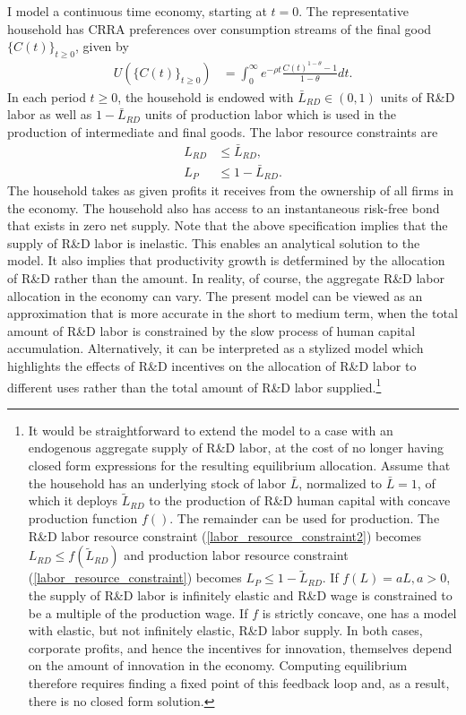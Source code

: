 \documentclass[ecta,nameyear,final]{econsocart}
\theoremstyle{plain}
\theoremstyle{remark}
\begin{document}
I model a continuous time economy, starting at $t = 0$. The representative household has CRRA preferences over consumption streams of the final good $\{C(t)\}_{t \ge 0}$, given by
\begin{align}
	U(\{C(t)\}_{t \ge 0}) &= \int_0^{\infty} e^{-\rho t} \frac{C(t)^{1-\theta} - 1}{1-\theta} dt. \label{preferences}
\end{align}
In each period $t \ge 0$, the household is endowed with $\bar{L}_{RD} \in (0,1)$ units of R\&D labor as well as $1 - \bar{L}_{RD}$ units of production labor which is used in the production of intermediate and final goods. The labor resource constraints are 
\begin{align}
	L_{RD} &\le \bar{L}_{RD}, \label{labor_resource_constraint2} \\
	L_{P} &\le 1 - \bar{L}_{RD}. \label{labor_resource_constraint} 
\end{align}
The household takes as given profits it receives from the ownership of all firms in the economy. The household also has access to an instantaneous risk-free bond that exists in zero net supply. Note that the above specification implies that the supply of R\&D labor is inelastic. This enables an analytical solution to the model. It also implies that productivity growth is detfermined by the allocation of R\&D rather than the amount. In reality, of course, the aggregate R\&D labor allocation in the economy can vary. The present model can be viewed as an approximation that is more accurate in the short to medium term, when the total amount of R\&D labor is constrained by the slow process of human capital accumulation. Alternatively, it can be interpreted as a stylized model which highlights the effects of R\&D incentives on the allocation of R\&D labor to different uses rather than the total amount of R\&D labor supplied.\footnote{It would be straightforward to extend the model to a case with an endogenous aggregate supply of R\&D labor, at the cost of no longer having closed form expressions for the resulting equilibrium allocation. Assume that the household has an underlying stock of labor $\bar{L}$, normalized to $\bar{L} = 1$, of which it deploys $\tilde{L}_{RD}$ to the production of R\&D human capital with concave production function $f()$. The remainder can be used for production. The R\&D labor resource constraint (\ref{labor_resource_constraint2}) becomes $L_{RD} \le f(\tilde{L}_{RD})$ and production labor resource constraint (\ref{labor_resource_constraint}) becomes $L_P \le 1 - \tilde{L}_{RD}$. If $f(L) = aL, a > 0$, the supply of R\&D labor is infinitely elastic and R\&D wage is constrained to be a multiple of the production wage. If $f$ is strictly concave, one has a model with elastic, but not infinitely elastic, R\&D labor supply. In both cases, corporate profits, and hence the incentives for innovation, themselves depend on the amount of innovation in the economy. Computing equilibrium therefore requires finding a fixed point of this feedback loop and, as a result, there is no closed form solution.}
\end{document}
